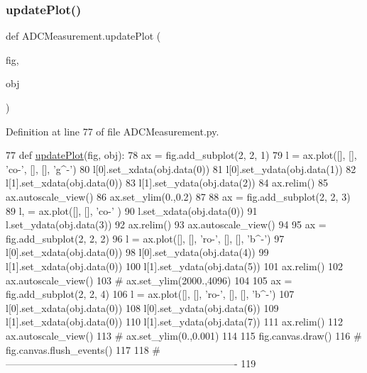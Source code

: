 \subsubsection{\texorpdfstring{update\+Plot()}{updatePlot()}}
{\footnotesize\ttfamily def A\+D\+C\+Measurement.\+update\+Plot (\begin{DoxyParamCaption}\item[{}]{fig,  }\item[{}]{obj }\end{DoxyParamCaption})}



Definition at line 77 of file A\+D\+C\+Measurement.\+py.


\begin{DoxyCode}
77 \textcolor{keyword}{def }\hyperlink{namespaceADCMeasurement_a7de3411faf8be50e833090d1c10cc44f}{updatePlot}(fig, obj):
78     ax = fig.add\_subplot(2, 2, 1)
79     l = ax.plot([], [], \textcolor{stringliteral}{'co-'}, [], [], \textcolor{stringliteral}{'g^-'})
80     l[0].set\_xdata(obj.data(0))
81     l[0].set\_ydata(obj.data(1))
82     l[1].set\_xdata(obj.data(0))
83     l[1].set\_ydata(obj.data(2))
84     ax.relim()
85     ax.autoscale\_view()
86     ax.set\_ylim(0.,0.2)
87 
88     ax = fig.add\_subplot(2, 2, 3)
89     l, = ax.plot([], [], \textcolor{stringliteral}{'co-'} )
90     l.set\_xdata(obj.data(0))
91     l.set\_ydata(obj.data(3))
92     ax.relim()
93     ax.autoscale\_view()
94 
95     ax = fig.add\_subplot(2, 2, 2)
96     l = ax.plot([], [], \textcolor{stringliteral}{'ro-'}, [], [], \textcolor{stringliteral}{'b^-'})
97     l[0].set\_xdata(obj.data(0))
98     l[0].set\_ydata(obj.data(4))
99     l[1].set\_xdata(obj.data(0))
100     l[1].set\_ydata(obj.data(5))
101     ax.relim()
102     ax.autoscale\_view()
103 \textcolor{comment}{#    ax.set\_ylim(2000.,4096)}
104 
105     ax = fig.add\_subplot(2, 2, 4)
106     l = ax.plot([], [], \textcolor{stringliteral}{'ro-'}, [], [], \textcolor{stringliteral}{'b^-'})
107     l[0].set\_xdata(obj.data(0))
108     l[0].set\_ydata(obj.data(6))
109     l[1].set\_xdata(obj.data(0))
110     l[1].set\_ydata(obj.data(7))
111     ax.relim()
112     ax.autoscale\_view()
113 \textcolor{comment}{#    ax.set\_ylim(0.,0.001)}
114 
115     fig.canvas.draw()
116 \textcolor{comment}{#    fig.canvas.flush\_events()}
117 
118 \textcolor{comment}{#----------------------------------------------------------------------}
119 \end{DoxyCode}
